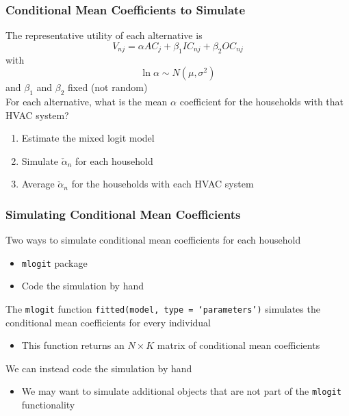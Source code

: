 \documentclass{beamer}\usepackage[]{graphicx}\usepackage[]{color}
\begin{document}
\begin{frame}\frametitle{Conditional Mean Coefficients to Simulate}
    The representative utility of each alternative is
    $$V_{nj} = \alpha AC_j + \beta_1 IC_{nj} + \beta_2 OC_{nj}$$
    with
    $$\ln \alpha \sim N(\mu, \sigma^2)$$
    and $\beta_1$ and $\beta_2$ fixed (not random) \\
    \vspace{3ex}
    For each alternative, what is the mean $\alpha$ coefficient for the households with that HVAC system?
    \begin{enumerate}
        \item Estimate the mixed logit model
        \item Simulate $\check{\alpha}_n$ for each household
        \item Average $\check{\alpha}_n$ for the households with each HVAC system
    \end{enumerate}
\end{frame}

\begin{frame}\frametitle{Simulating Conditional Mean Coefficients}
    Two ways to simulate conditional mean coefficients for each household
    \begin{itemize}
        \item \texttt{mlogit} package
        \item Code the simulation by hand
    \end{itemize}
    \vspace{2ex}
    The \texttt{mlogit} function \texttt{fitted(model, type = `parameters')} simulates the conditional mean coefficients for every individual
    \begin{itemize}
        \item This function returns an $N \times K$ matrix of conditional mean coefficients
    \end{itemize}
    \vspace{2ex}
    We can instead code the simulation by hand
    \begin{itemize}
        \item We may want to simulate additional objects that are not part of the \texttt{mlogit} functionality
    \end{itemize}
\end{frame}
\end{document}
